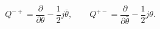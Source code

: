 \begin{equation}
  Q^{-+}=\frac{\partial}{\partial\theta}-\frac{1}{2}j\bar\theta,\qquad
  Q^{+-}=\frac{\partial}{\partial\bar\theta}-\frac{1}{2}j\theta.
\label{susyforcomp}
 \end{equation}

